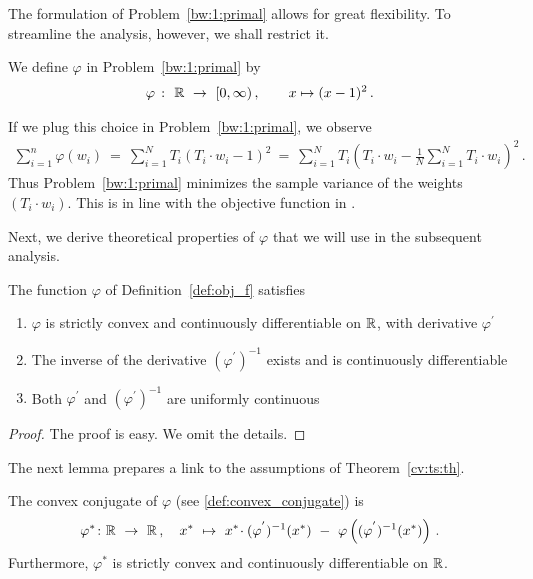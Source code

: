 The formulation of Problem~\ref{bw:1:primal} allows for great 
flexibility.
%
To streamline the analysis, however, we shall restrict it.
%
\begin{definition}
  \label{def:obj_f}
  We define $\varphi$ in Problem~\ref{bw:1:primal} by
  \begin{align*}
    \varphi
    \ 
    \colon
    \ 
    \R
    \ 
    \to
    \ 
    [0,\infty)
    \,,
    \qquad
    x\mapsto (x-1)^2
    \,.
  \end{align*}
\end{definition}
\begin{remark}
  If we plug this choice in Problem~\ref{bw:1:primal},
  we observe
  \begin{align*}
    \sum_{i=1}^{n} 
\varphi(w_i)
\ 
=
\ 
    \sum_{i=1}^{N}
    T_i
    \left( 
      T_i\cdot w_i
      -
      1
    \right)
    ^{2}
\ 
=
\ 
    \sum_{i=1}^{N}
    T_i
    \left( 
      T_i\cdot w_i
      -
      \frac{1}{N}
      \sum_{i=1}^{N} 
      T_i\cdot w_i
    \right)
    ^{2}
    \,.
  \end{align*}
  Thus Problem~\ref{bw:1:primal} minimizes the sample variance of the weights 
  $(T_i\cdot w_i)$. This is in line with the objective function in \cite{Zubizarreta2015}.
\end{remark}
Next, we derive theoretical properties of $\varphi$ that we will use in the subsequent analysis.
\begin{lemma}
  \label{lem:obj_f}
  The function $\varphi$ of Definition~\ref{def:obj_f} satisfies

  \begin{enumerate}[label=(\roman*)]
    \item $\varphi$ is strictly convex and continuously differentiable on $\mathbb{R}$, with derivative $\varphi^{'}$
    \item
      The inverse of the derivative 
      $(\varphi^{'})^{-1}$
      exists and is continuously differentiable
    \item
      Both $\varphi^{'}$ and
      $(\varphi^{'})^{-1}$
      are uniformly continuous
  \end{enumerate}
\end{lemma}
\begin{proof}
  The proof is easy. We omit the details.
\end{proof}
The next lemma prepares a link to the assumptions of Theorem~\ref{cv:ts:th}.
\begin{lemma}
  \label{1165}
  The convex conjugate of $\varphi$ (see \eqref{def:convex_conjugate}) is
  \begin{gather*}
    \varphi^*
    \colon
    \R
    \ 
    \to
    \ 
    \R
    \,,
    \quad
    x^*
    \ 
    \mapsto
    \ 
    x^*
    \!
    \cdot
    (
    \varphi^{'}
    )^{-1}
    (x^*)
    \ 
    -
    \ 
    \varphi
    \left( 
      (
    \varphi^{'}
    )^{-1}
    (x^*)
    \right)
    \,.
  \end{gather*}
  Furthermore, $\varphi^*$ is strictly convex and continuously differentiable on $\mathbb{R}$.
\end{lemma}
